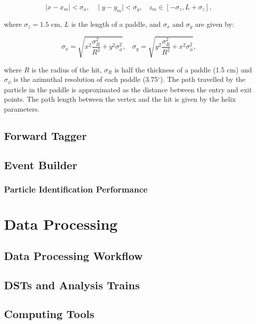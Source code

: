 \documentclass{elsart}
\begin{document}
\begin{equation}
\mid x-x_{m} \mid < \sigma_x ,~~~~\mid y-y_{m} \mid < \sigma_y , ~~~~z_{m}  \in [-\sigma_z,L+\sigma_z],
\end{equation}

\noindent
where $\sigma_z=1.5$ cm, $ L$ is the length of a paddle, and $\sigma_x$ and $\sigma_y$ are given by:

\begin{equation}
\sigma_x= \sqrt{x^{2}\frac{\sigma_{R}^{2}}{R^2}+y^{2}\sigma_{\phi}^{2}},~~~~
\sigma_y= \sqrt{y^{2}\frac{\sigma_{R}^{2}}{R^2}+x^{2}\sigma_{\phi}^{2}},
\end{equation}

\noindent
where $R$ is the radius of the hit, $\sigma_R$ is half the thickness of a paddle (1.5 cm) and $\sigma_{\phi}$
is the azimuthal resolution of each paddle (3.75$^{\circ}$). The path travelled by the particle in the paddle is
approximated as the distance between the entry and exit points. The path length between the vertex and the
hit is given by the helix parameters.

\subsection{Forward Tagger}

\subsection{Event Builder}

\subsubsection{Particle Identification Performance}

\section{Data Processing}

\subsection{Data Processing Workflow}

\subsection{DSTs and Analysis Trains}

\subsection{Computing Tools}
\end{document}
